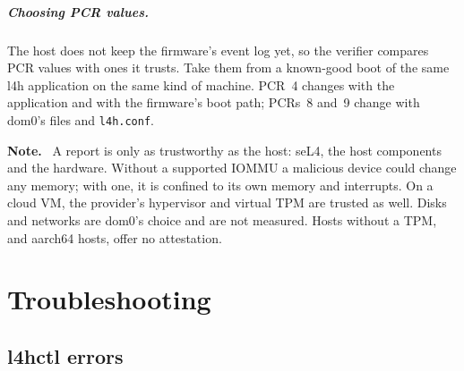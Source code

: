 \documentclass[11pt,a4paper]{report}
\newcommand{\file}[1]{\texttt{#1}}
\newenvironment{caveat}{\par\medskip\noindent\color{note}\textbf{Note.}\ }{\par\medskip}
\begin{document}
\paragraph{Choosing PCR values.} The host does not keep the firmware's event
log yet, so the verifier compares PCR values with ones it trusts. Take them
from a known-good boot of the same l4h application on the same kind of
machine. PCR~4 changes with the application and with the firmware's boot
path; PCRs~8 and~9 change with dom0's files and \file{l4h.conf}.

\begin{caveat}
A report is only as trustworthy as the host: seL4, the host components and
the hardware. Without a supported IOMMU a malicious device could change any
memory; with one, it is confined to its own memory and interrupts. On a cloud VM, the provider's hypervisor and virtual TPM are
trusted as well. Disks and networks are dom0's choice and are not measured.
Hosts without a TPM, and aarch64 hosts, offer no attestation.
\end{caveat}

\chapter{Troubleshooting}
\label{ch:trouble}

\section{l4hctl errors}
\label{sec:errors}
\end{document}

